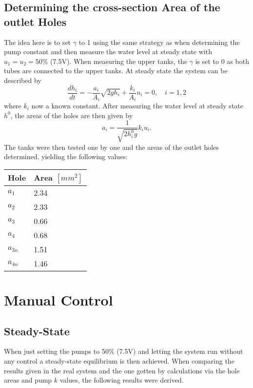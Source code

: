 \documentclass[a4paper,12pt,oneside,onecolumn]{article}
\begin{document}
\subsection{Determining the cross-section Area of the outlet Holes}
The idea here is to set $\gamma$ to 1 using the same strategy as when determining the pump constant and then measure the water level at steady state with $u_1=u_2=50$\% (7.5V). When measuring the upper tanks, the $\gamma$ is set to 0 as both tubes are connected to the upper tanks.
At steady state the system can be described by
\begin{equation}
    \frac{dh_i}{dt} =-\frac{a_i}{A_i}\sqrt{2gh_i}+\frac{k_i}{A_i}u_i=0, \quad i = 1,2
\end{equation}
where $k_i$ now a known constant. %
After measuring the water level at steady state $h^0$, the areas of the holes are then given by
\begin{equation}
    a_i = \frac{1}{\sqrt{2h^0_i g}}k_i u_i.
\end{equation}
The tanks were then tested one by one and the areas of the outlet holes determined, yielding the following values:

\begin{center}
    \begin{tabular}{|l|l|}
    Hole & Area $[mm^2]$ \\
    \hline
    $a_1$ & 2.34\\
    $a_2$ & 2.33\\
    $a_3$ & 0.66\\
    $a_4$ & 0.68\\
    $a_{3n}$ & 1.51\\
    $a_{4n}$ & 1.46\\
    \end{tabular}
\end{center}

\section{Manual Control}
\subsection{Steady-State}
When just setting the pumps to 50\% (7.5V) and letting the system run without any control a steady-state equilibrium is then achieved. When comparing the results given in the real system and the one gotten by calculations via the hole areas and pump $k$ values, the following results were derived.
\end{document}
